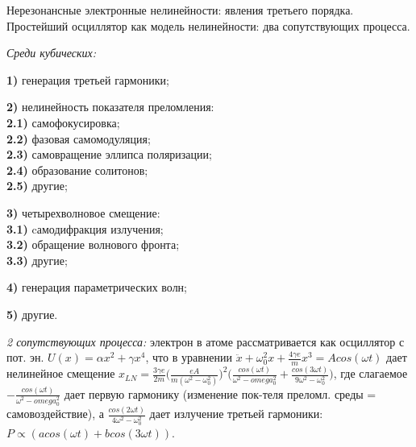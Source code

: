 
\begin{leftrules}
Нерезонансные электронные нелинейности: явления третьего порядка. Простейший осциллятор как модель нелинейности: два сопутствующих процесса.
\end{leftrules}



\textit{Среди кубических:}\\
    \par \textbf{1)} генерация третьей гармоники; \\
    \par \textbf{2)} нелинейность показателя преломления: \\
     \textbf{2.1)} самофокусировка; \\
     \textbf{2.2)} фазовая самомодуляция; \\
     \textbf{2.3)} самовращение эллипса поляризации; \\
     \textbf{2.4)} образование солитонов; \\
     \textbf{2.5)} другие; \\
    \par \textbf{3)} четырехволновое смещение: \\
     \textbf{3.1)} cамодифракция излучения; \\
     \textbf{3.2)} обращение волнового фронта; \\
     \textbf{3.3)} другие; \\
    \par \textbf{4)} генерация параметрических волн; \\
    \par \textbf{5)} другие.


\textit{2 сопутствующих процесса:} электрон в атоме рассматривается как осциллятор с пот. эн. $U(x)=\alpha x^{2} + \gamma x^{4}$, что в уравнении $\ddot{x} + \omega_{0}^{2} x + \frac{4\gamma e}{m} x^{3} = Acos(\omega t)$ дает нелинейное смещение $x_{LN} = \frac{3\gamma e}{2m} \Big( \frac{eA}{m(\omega^{2}-\omega_{0}^{2})} \Big)^{2} \Big( \frac{cos(\omega t)}{\omega^{2}-omega_{0}^{2}} + \frac{cos(3\omega t)}{9\omega^{2}-\omega_{0}^{2}} \Big)$, где слагаемое $-\frac{cos(\omega t)}{\omega^{2}-omega_{0}^{2}}$ дает первую гармонику (изменение пок-теля преломл. среды = самовоздействие), а $\frac{cos(2\omega t)}{4\omega^{2}-\omega_{0}^{2}}$ дает излучение третьей гармоники: $P \propto (acos(\omega t)+bcos(3\omega t))$.
